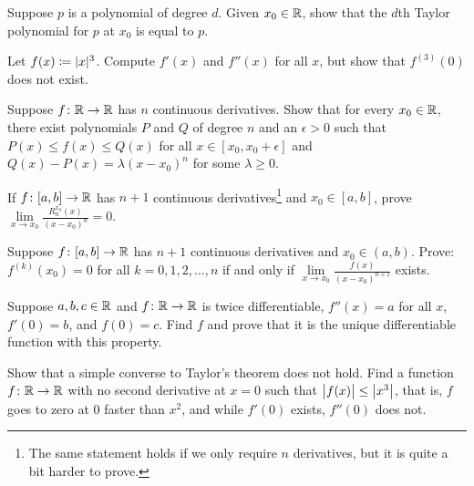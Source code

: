 \begin{exercise}
Suppose $p$ is a polynomial of degree $d$.  Given $x_0 \in {\mathbb{R}}$,
show that
the $d$th Taylor polynomial for $p$ at $x_0$ is equal to $p$.
\end{exercise}

\begin{exercise}
Let $f(x) \coloneqq \lvert {x} \rvert^3$.  Compute $f'(x)$ and $f''(x)$ for all $x$,
but show that $f^{(3)}(0)$ does not exist.
\end{exercise}

\begin{exercise}
Suppose $f \colon {\mathbb{R}} \to {\mathbb{R}}$ has $n$ continuous derivatives.  Show
that for every $x_0 \in {\mathbb{R}}$,
there exist polynomials $P$ and $Q$ of degree $n$ and 
an $\epsilon > 0$ such that $P(x) \leq f(x) \leq Q(x)$ for all $x \in
[x_0,x_0+\epsilon]$  and
$Q(x)-P(x) = \lambda {(x-x_0)}^n$ for some $\lambda \geq 0$.
\end{exercise}

\begin{exercise}
If $f \colon [a,b] \to {\mathbb{R}}$ has $n+1$ continuous derivatives\footnote{%
The same statement holds if we only require $n$ derivatives,
but it is quite a bit harder to prove.
}
and $x_0 \in [a,b]$,
prove
$\lim\limits_{x\to x_0} \frac{R_n^{x_0}(x)}{{(x-x_0)}^n} = 0$.
\end{exercise}

\begin{exercise}
Suppose $f \colon [a,b] \to {\mathbb{R}}$ has $n+1$ continuous derivatives
and $x_0 \in (a,b)$.
Prove: $f^{(k)}(x_0) = 0$ for all $k = 0, 1, 2, \ldots, n$
if and only if $\lim\limits_{x\to x_0} \frac{f(x)}{{(x-x_0)}^{n+1}}$ exists.
\end{exercise}

\begin{exercise}
Suppose $a,b,c \in {\mathbb{R}}$ and $f \colon {\mathbb{R}} \to {\mathbb{R}}$ is twice differentiable,
$f''(x) = a$ for all $x$, $f'(0) = b$, and $f(0) = c$.  Find $f$ and prove that 
it is the unique differentiable function with this property.
\end{exercise}

\begin{exercise}[Challenging]
Show that a simple converse to Taylor's theorem does not hold.
Find a function $f \colon {\mathbb{R}} \to {\mathbb{R}}$ with no second derivative at $x=0$ such that
$\bigl\lvert {f(x)} \bigr\rvert \leq \bigl\lvert {x^3} \bigr\rvert$, that is, $f$ goes to zero at 0 faster than $x^2$, and
while $f'(0)$ exists, $f''(0)$ does not.
\end{exercise}

